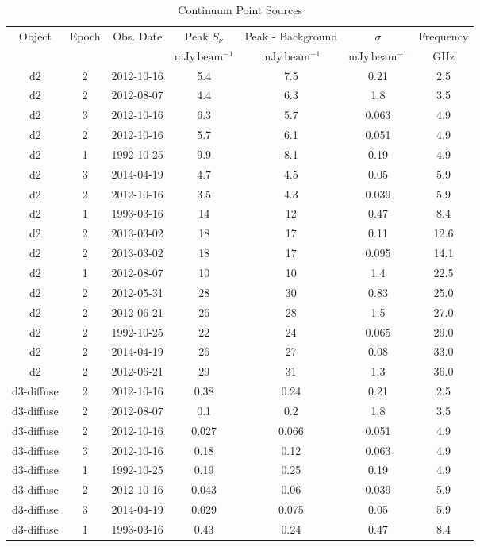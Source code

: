 \begin{table*}[htp]
\caption{Continuum Point Sources}
\begin{tabular}{ccccccc}
\label{tab:contsrcs_full}
Object & Epoch & Obs. Date & Peak $S_{\nu}$ & Peak - Background & $\sigma$ & Frequency \\
 &  &  & $\mathrm{mJy\,beam^{-1}}$ & $\mathrm{mJy\,beam^{-1}}$ & $\mathrm{mJy\,beam^{-1}}$ & $\mathrm{GHz}$ \\
\hline
d2 & 2 & 2012-10-16 & 5.4 & 7.5 & 0.21 & 2.5 \\
d2 & 2 & 2012-08-07 & 4.4 & 6.3 & 1.8 & 3.5 \\
d2 & 3 & 2012-10-16 & 6.3 & 5.7 & 0.063 & 4.9 \\
d2 & 2 & 2012-10-16 & 5.7 & 6.1 & 0.051 & 4.9 \\
d2 & 1 & 1992-10-25 & 9.9 & 8.1 & 0.19 & 4.9 \\
d2 & 3 & 2014-04-19 & 4.7 & 4.5 & 0.05 & 5.9 \\
d2 & 2 & 2012-10-16 & 3.5 & 4.3 & 0.039 & 5.9 \\
d2 & 1 & 1993-03-16 & 14 & 12 & 0.47 & 8.4 \\
d2 & 2 & 2013-03-02 & 18 & 17 & 0.11 & 12.6 \\
d2 & 2 & 2013-03-02 & 18 & 17 & 0.095 & 14.1 \\
d2 & 1 & 2012-08-07 & 10 & 10 & 1.4 & 22.5 \\
d2 & 2 & 2012-05-31 & 28 & 30 & 0.83 & 25.0 \\
d2 & 2 & 2012-06-21 & 26 & 28 & 1.5 & 27.0 \\
d2 & 2 & 1992-10-25 & 22 & 24 & 0.065 & 29.0 \\
d2 & 2 & 2014-04-19 & 26 & 27 & 0.08 & 33.0 \\
d2 & 2 & 2012-06-21 & 29 & 31 & 1.3 & 36.0 \\
d3-diffuse & 2 & 2012-10-16 & 0.38 & 0.24 & 0.21 & 2.5 \\
d3-diffuse & 2 & 2012-08-07 & 0.1 & 0.2 & 1.8 & 3.5 \\
d3-diffuse & 2 & 2012-10-16 & 0.027 & 0.066 & 0.051 & 4.9 \\
d3-diffuse & 3 & 2012-10-16 & 0.18 & 0.12 & 0.063 & 4.9 \\
d3-diffuse & 1 & 1992-10-25 & 0.19 & 0.25 & 0.19 & 4.9 \\
d3-diffuse & 2 & 2012-10-16 & 0.043 & 0.06 & 0.039 & 5.9 \\
d3-diffuse & 3 & 2014-04-19 & 0.029 & 0.075 & 0.05 & 5.9 \\
d3-diffuse & 1 & 1993-03-16 & 0.43 & 0.24 & 0.47 & 8.4 \\

\end{tabular}
\end{table*}
